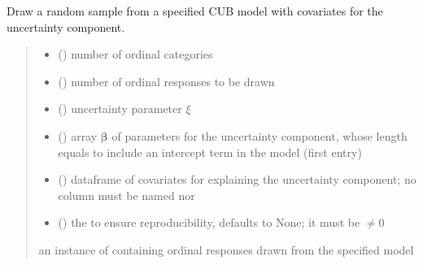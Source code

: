 \documentclass[letterpaper,10pt,english]{sphinxmanual}
\begin{document}
\begin{fulllineitems}
\label{\detokenize{cubmods:cubmods.cub_y0.draw}}
\pysigstartsignatures
{}
\pysigstopsignatures
\sphinxAtStartPar
Draw a random sample from a specified CUB model with covariates for
the uncertainty component.
\begin{quote}\begin{description}
\begin{itemize}
\item {} 
\sphinxAtStartPar
{} () \textendash{} number of ordinal categories

\item {} 
\sphinxAtStartPar
{} () \textendash{} number of ordinal responses to be drawn

\item {} 
\sphinxAtStartPar
{} () \textendash{} uncertainty parameter \(\xi\)

\item {} 
\sphinxAtStartPar
{} () \textendash{} array \(\pmb \beta\) of parameters for the uncertainty component, whose length equals 
 to include an intercept term in the model (first entry)

\item {} 
\sphinxAtStartPar
{} () \textendash{} dataframe of covariates for explaining the uncertainty component;
no column must be named  nor 

\item {} 
\sphinxAtStartPar
{} (\sphinxstyleliteralemphasis{\sphinxupquote{, }}) \textendash{} the  to ensure reproducibility, defaults to None;
it must be \(\neq 0\)

\end{itemize}

\sphinxAtStartPar
an instance of  containing ordinal responses drawn from the specified model

\end{description}\end{quote}

\end{fulllineitems}
\end{document}
